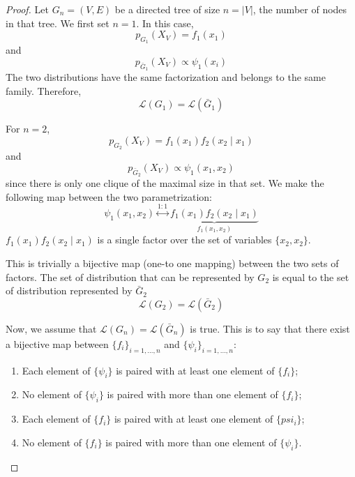 \documentclass{article}
\numberwithin{equation}{section}
\theoremstyle{named}
\begin{document}
\begin{proof}
        Let $G_n = (V, E)$ be a directed tree of size $n = |V|$, the number of nodes 
        in that tree. 
        We first set $n = 1$. In this case, 
        \[
                p_{G_1}(X_V) = f_1(x_1)
        \]
        and
        \[
                p_{\bar{G}_1}(X_V) \propto \psi_1(x_i)
        \]
        The two distributions have the same factorization and belongs to the same family.
        Therefore, 
        \[
                \mathcal{L}(G_1) = \mathcal{L}(\bar{G}_1)
        \]

        For $n = 2$, 
        \[
                p_{G_2}(X_V) = f_1(x_1)f_2(x_2 \mid x_1)
        \]
        and
        \[
                p_{\bar{G}_2}(X_V) \propto \psi_1(x_1,  x_2) 
        \]
        since there is only one clique of the maximal size in that set. 
        We make the following map between the two parametrization:
        \[
                \psi_1(x_1, x_2)
                \overset{1:1}{\longleftrightarrow}
                \underbrace{f_1(x_1)f_2(x_2 \mid x_1)}_
                {\displaystyle f_1(x_1, x_2)}
        \]
        $f_1(x_1)f_2(x_2 \mid x_1)$ 
        is a single factor over the set of variables $\{x_2, x_2\}$. 

        This is trivially a bijective map (one-to one mapping) 
        between the two sets of factors. The 
        set of distribution that can be represented by $G_2$ is equal to the 
        set of distribution represented by $\bar{G}_2$
        \[
                \mathcal{L}(G_2) = \mathcal{L}(\bar{G}_2)
        \]

        Now, we assume that $\mathcal{L}(G_n) = \mathcal{L}(\bar{G}_n)$ is true. 
        This is to say that there exist a bijective map between 
        $\{f_i\}_{i=1,\dots,n}$ and $\{\psi_i\}_{i=1,\dots,n}$:
        \begin{enumerate}
                \item Each element of $\{\psi_i\}$ 
                        is paired with at least one element of $\{f_i\}$;
                \item No element of $\{\psi_i\}$ is paired with more than 
                        one element of $\{f_i\}$;
                \item Each element of $\{f_i\}$ is paired with at least 
                        one element of $\{psi_i\}$;
                \item No element of $\{f_i\}$ is paired with more than 
                        one element of $\{\psi_i\}$.
                

\end{enumerate}
\end{proof}
\end{document}
